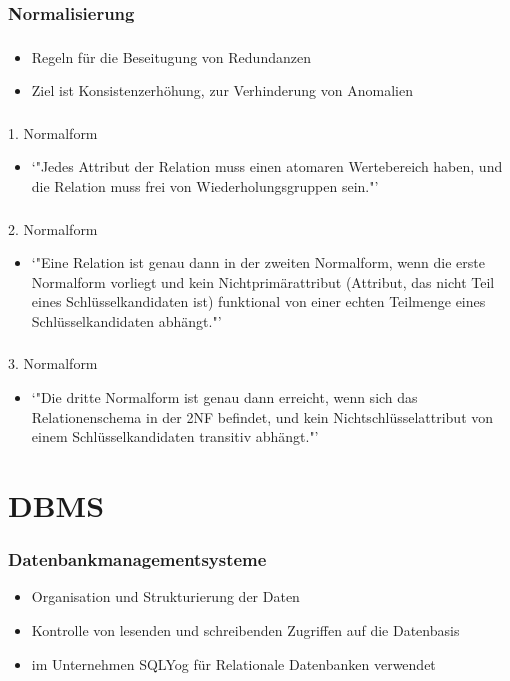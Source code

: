 \documentclass[aspectratio=169,14pt,xcolor=dvipsnames]{beamer}
\begin{document}
\subsubsection{Normalisierung}
\begin{frame}[t]
    \frametitle{\subsecname}
    \framesubtitle{\subsubsecname}
    \begin{itemize}
        \item Regeln für die Beseitugung von Redundanzen
        \item Ziel ist Konsistenzerhöhung, zur Verhinderung von Anomalien
    \end{itemize}
\end{frame}

\begin{frame}[t]
    \frametitle{\subsecname}
    \framesubtitle{\subsubsecname}
    1. Normalform
    \begin{itemize}
        \item `"Jedes Attribut der Relation muss einen atomaren Wertebereich haben, und die Relation muss frei von Wiederholungsgruppen sein."'
    \end{itemize}
\end{frame}

\begin{frame}[t]
    \frametitle{\subsecname}
    \framesubtitle{\subsubsecname}
    2. Normalform
    \begin{itemize}
        \item `"Eine Relation ist genau dann in der zweiten Normalform, wenn die erste Normalform vorliegt und kein Nichtprimärattribut (Attribut, das nicht Teil eines Schlüsselkandidaten ist) funktional von einer echten Teilmenge eines Schlüsselkandidaten abhängt."'
    \end{itemize}
\end{frame}

\begin{frame}[t]
    \frametitle{\subsecname}
    \framesubtitle{\subsubsecname}
    3. Normalform
    \begin{itemize}
        \item `"Die dritte Normalform ist genau dann erreicht, wenn sich das Relationenschema in der 2NF befindet, und kein Nichtschlüsselattribut von einem Schlüsselkandidaten transitiv abhängt."'
    \end{itemize}
\end{frame}

\section{DBMS}
\begin{frame}[t]
    \frametitle{Datenbankmanagementsysteme}
    \begin{itemize}
        \item Organisation und Strukturierung der Daten
        \item Kontrolle von lesenden und schreibenden Zugriffen auf die Datenbasis
        \item im Unternehmen SQLYog für Relationale Datenbanken verwendet
    \end{itemize}
\end{frame}
\end{document}
